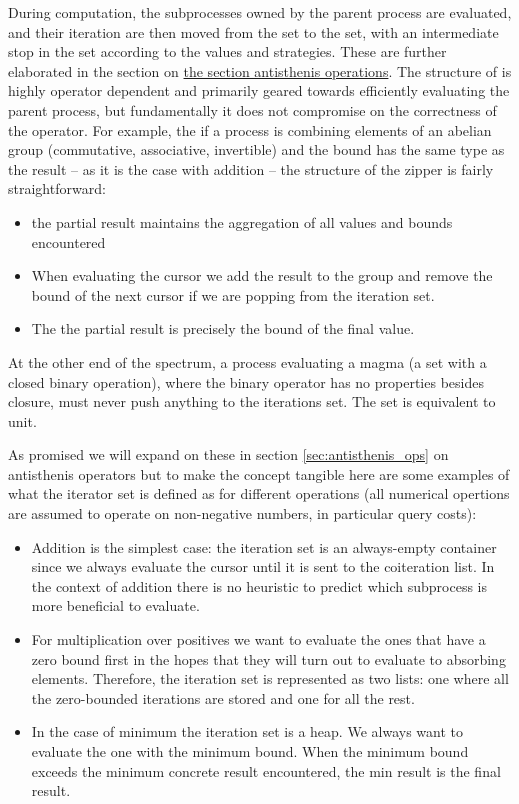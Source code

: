 During computation, the subprocesses owned by the parent process are
evaluated, and their iteration are then moved from the 
set to the  set, with an intermediate stop in the
 set according to the values and strategies. These
are further elaborated in the section on
\hyperref[sec:antisthenis_ops]{the section antisthenis
  operations}. The structure of  is highly operator
dependent and primarily geared towards efficiently evaluating the
parent process, but fundamentally it does not compromise on the
correctness of the operator. For example, the if a process is
combining elements of an abelian group (commutative, associative,
invertible) and the bound has the same type as the result -- as it is
the case with addition -- the structure of the zipper is fairly
straightforward:

\begin{itemize}
\item the partial result maintains the aggregation of all values and
  bounds encountered
\item When evaluating the cursor we add the result to the group and
  remove the bound of the next cursor if we are popping from the
  iteration set.
\item The the partial result is precisely the bound of the final
  value.
\end{itemize}



At the other end of the spectrum, a process evaluating a magma (a set
with a closed binary operation), where the binary operator has no
properties besides closure, must never push anything to the iterations
set. The set is equivalent to unit.

As promised we will expand on these in section
\ref{sec:antisthenis_ops} on antisthenis operators but to make the
concept tangible here are some examples of what the iterator set is
defined as for different operations (all numerical opertions are
assumed to operate on non-negative numbers, in particular query
costs):

\begin{itemize}
\item Addition is the simplest case: the iteration set is an
  always-empty container since we always evaluate the cursor until it
  is sent to the coiteration list. In the context of addition there is
  no heuristic to predict which subprocess is more beneficial to
  evaluate.
\item For multiplication over positives we want to evaluate the ones
  that have a zero bound first in the hopes that they will turn out to
  evaluate to absorbing elements. Therefore, the iteration set is
  represented as two lists: one where all the zero-bounded iterations
  are stored and one for all the rest.
\item In the case of minimum the iteration set is a heap. We always
  want to evaluate the one with the minimum bound. When the minimum
  bound exceeds the minimum concrete result encountered, the min
  result is the final result.
\end{itemize}

